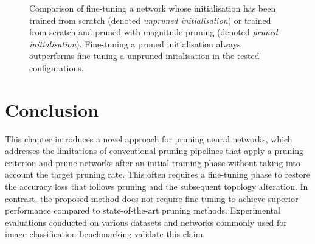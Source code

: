 \begin{figure}
  \caption{ Comparison of fine-tuning a network whose initialisation has been
  trained from scratch (denoted \emph{unpruned initialisation}) or trained from
  scratch and pruned with magnitude pruning (denoted \emph{pruned
  initialisation}). Fine-tuning a pruned initialisation always outperforms
  fine-tuning a unpruned initalisation in the tested configurations.} 
    \label{fig:chap1:finetuning_with_init_not_pruned}

\end{figure}




\section{Conclusion}
\label{sec:chap1:conclusion}


This chapter introduces a novel approach for pruning neural networks, which
addresses the limitations of conventional pruning pipelines that apply a pruning
criterion and prune networks after an initial training phase without taking into
account the target pruning rate. This often requires a fine-tuning phase to
restore the accuracy loss that follows pruning and the subsequent topology
alteration. In contrast, the proposed method does not require fine-tuning to
achieve superior performance compared to state-of-the-art pruning methods.
Experimental evaluations conducted on various datasets and networks commonly
used for image classification benchmarking validate this claim.\\

